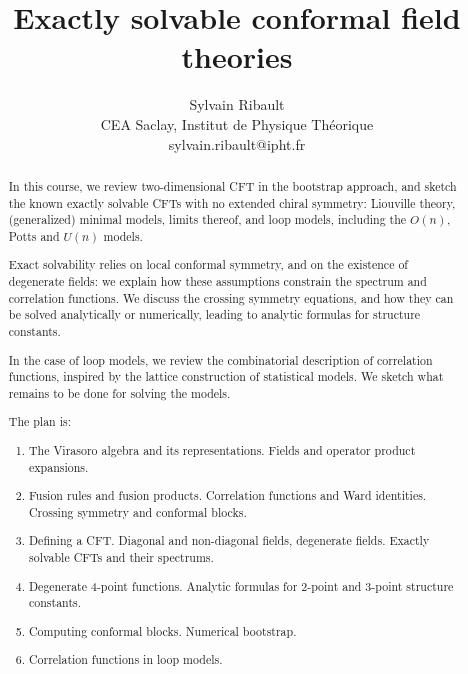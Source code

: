 \documentclass[12pt, a4paper]{article}
\title{\bfseries Exactly solvable conformal field theories}
\author{Sylvain Ribault \vspace{2mm}
\\
{\normalsize CEA Saclay, Institut de Physique Th\'eorique}
 \\
 {\footnotesize \ttfamily sylvain.ribault@ipht.fr }
}
\theoremstyle{break}
\begin{document}
\maketitle


\begin{abstract}
In this course, we review two-dimensional CFT in the bootstrap approach, and sketch the known exactly solvable CFTs with no extended chiral symmetry: Liouville theory, (generalized) minimal models, limits thereof, and loop models, including the $O(n)$, Potts and $U(n)$ models. 

Exact solvability relies on local conformal symmetry, and on the existence of degenerate fields: we explain how these assumptions constrain the spectrum and correlation functions. We discuss the crossing symmetry equations, and how they can be solved analytically or numerically, leading to  
analytic formulas for structure constants. 

In the case of loop models, we review the combinatorial description of correlation functions, inspired by the lattice construction of statistical models. We sketch what remains to be done for solving the models. 


The plan is: 
\begin{enumerate}
 \item The Virasoro algebra and its representations. Fields and operator product expansions.
 \item Fusion rules and fusion products. Correlation functions and Ward identities. Crossing symmetry and conformal blocks. 
 \item Defining a CFT. Diagonal and non-diagonal fields, degenerate fields. Exactly solvable CFTs and their spectrums. 
 \item Degenerate 4-point functions. Analytic formulas for 2-point and 3-point structure constants. 
 \item Computing conformal blocks. Numerical bootstrap.
 \item Correlation functions in loop models. 
\end{enumerate}
\end{abstract}

\vspace{5mm}


\clearpage

\tableofcontents

\hypersetup{linkcolor=blue}

\setcounter{section}{-1}
\end{document}
